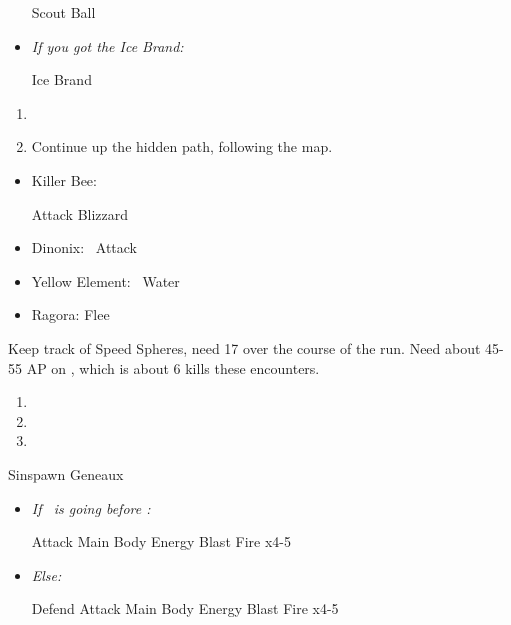 \begin{equip}
	\begin{itemize}
		\wakkaf Scout Ball
		\item \textit{If you got the Ice Brand:}
		\begin{itemize}
			\tidusf Ice Brand
		\end{itemize}
	\end{itemize}
\end{equip}
\begin{enumerate}[resume]
	\item \formation{\tidus}{\yuna}{\wakka}
	\item Continue up the hidden path, following the map.
\end{enumerate}
\begin{encounters}
	\begin{itemize}
		\item Killer Bee:
			\begin{itemize}
				\wakkaf Attack
				\luluf Blizzard
			\end{itemize}
		\item Dinonix: \tidus\ Attack
		\item Yellow Element: \lulu\ Water
		\item Ragora: Flee
	\end{itemize}
	Keep track of Speed Spheres, need 17 over the course of the run. Need about 45-55 AP on \tidus, which is about 6 kills these encounters.
\end{encounters}
\begin{enumerate}[resume]
	\item \sd
	\item \formation{\tidus}{\yuna}{\wakka}
	\item \save
\end{enumerate}
\begin{battle}[3000]{Sinspawn Geneaux}
	\begin{itemize}
	\item \textit{If \tidus\ is going before \yuna:}
	\begin{itemize}
		\tidusf Attack Main Body
		\summon{\valefor}
		\valeforf Energy Blast \od
		\valeforf Fire x4-5
	\end{itemize}
	\item \textit{Else:}
	\begin{itemize}
		\switch{\yuna}{\kimahri}
		\kimahrif Defend
		\tidusf Attack Main Body
		\switch{anyone}{\yuna}
		\summon{\valefor}
		\valeforf Energy Blast \od
		\valeforf Fire x4-5
	\end{itemize}
	\end{itemize}
\end{battle}
